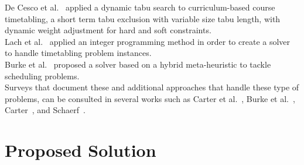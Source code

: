 De Cesco et al.~\cite{DeCesco2008} applied a dynamic tabu search to curriculum-based course timetabling, a short term tabu exclusion with variable size tabu length, with dynamic weight adjustment for hard and soft constraints.\\
Lach et al.~\cite{Lach2008} applied an integer programming method in order to create a solver to handle timetabling problem instances.\\
Burke et al.~\cite{Burke2009} proposed a solver based on a hybrid meta-heuristic to tackle scheduling problems.\\
Surveys that document these and additional approaches that handle these type of problems, can be consulted in several works such as Carter et al.~\cite{Carter1996}, Burke et al.~\cite{Burke2002}, Carter~\cite{Carter1986}, and Schaerf~\cite{Schaerf1999}.
\section{Proposed Solution}
\label{implementation}
